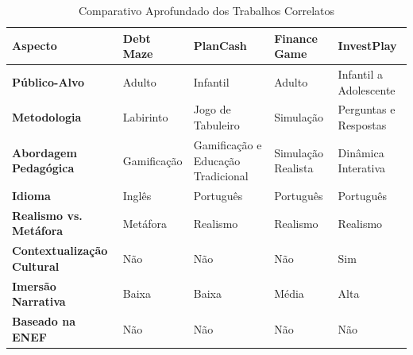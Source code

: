 \begin{table}[!htbp]
	\centering
	\renewcommand{\arraystretch}{1.3}
	\caption{Comparativo Aprofundado dos Trabalhos Correlatos}%
	\label{tab:comparativo-trabalhos}
	\begin{tabular}{| L{3cm} | L{3cm} | L{3cm} | L{3cm} | L{3cm} |}
		\hline
		\textbf{Aspecto}                   & \textbf{Debt Maze} & \textbf{PlanCash}                  & \textbf{Finance Game} & \textbf{InvestPlay}    \\
		\hline
		\hline
		\textbf{Público-Alvo}              & Adulto             & Infantil                           & Adulto                & Infantil a Adolescente \\
		\hline
		\textbf{Metodologia}               & Labirinto          & Jogo de Tabuleiro                  & Simulação             & Perguntas e Respostas  \\
		\hline
		\textbf{Abordagem Pedagógica}      & Gamificação        & Gamificação e Educação Tradicional & Simulação Realista    & Dinâmica Interativa    \\
		\hline
		\textbf{Idioma}                    & Inglês             & Português                          & Português             & Português              \\
		\hline
		\textbf{Realismo vs. Metáfora}     & Metáfora           & Realismo                           & Realismo              & Realismo               \\
		\hline
		\textbf{Contextualização Cultural} & Não                & Não                                & Não                   & Sim                    \\
		\hline
		\textbf{Imersão Narrativa}         & Baixa              & Baixa                              & Média                 & Alta                   \\
		\hline
		\textbf{Baseado na ENEF}           & Não                & Não                                & Não                   & Não                    \\
		\hline
	\end{tabular}
	\vspace{2mm}
\end{table}